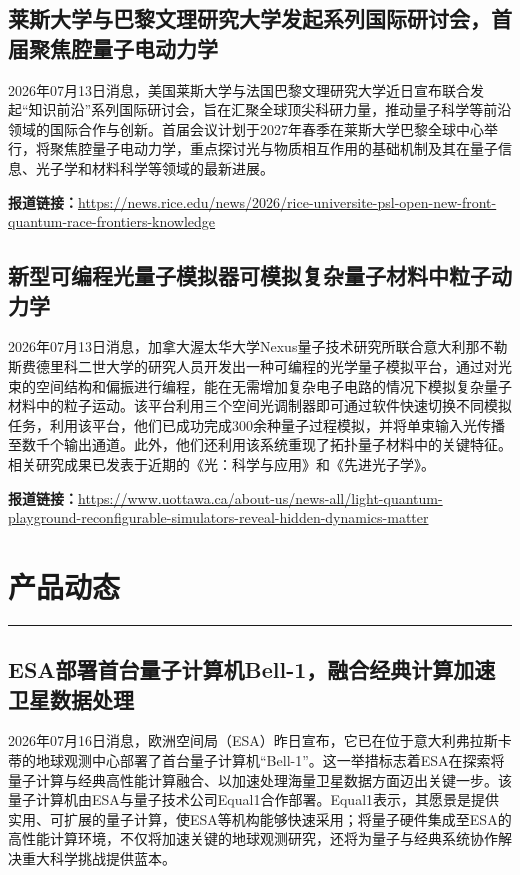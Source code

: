 \documentclass[12pt,a4paper]{ctexart}
\begin{document}
\subsection{ 莱斯大学与巴黎文理研究大学发起系列国际研讨会，首届聚焦腔量子电动力学 }

2026年07月13日消息，美国莱斯大学与法国巴黎文理研究大学近日宣布联合发起“知识前沿”系列国际研讨会，旨在汇聚全球顶尖科研力量，推动量子科学等前沿领域的国际合作与创新。首届会议计划于2027年春季在莱斯大学巴黎全球中心举行，将聚焦腔量子电动力学，重点探讨光与物质相互作用的基础机制及其在量子信息、光子学和材料科学等领域的最新进展。

\noindent\textbf{报道链接：}\url{https://news.rice.edu/news/2026/rice-universite-psl-open-new-front-quantum-race-frontiers-knowledge}

\subsection{ 新型可编程光量子模拟器可模拟复杂量子材料中粒子动力学 }

2026年07月13日消息，加拿大渥太华大学Nexus量子技术研究所联合意大利那不勒斯费德里科二世大学的研究人员开发出一种可编程的光学量子模拟平台，通过对光束的空间结构和偏振进行编程，能在无需增加复杂电子电路的情况下模拟复杂量子材料中的粒子运动。该平台利用三个空间光调制器即可通过软件快速切换不同模拟任务，利用该平台，他们已成功完成300余种量子过程模拟，并将单束输入光传播至数千个输出通道。此外，他们还利用该系统重现了拓扑量子材料中的关键特征。相关研究成果已发表于近期的《光：科学与应用》和《先进光子学》。

\noindent\textbf{报道链接：}\url{https://www.uottawa.ca/about-us/news-all/light-quantum-playground-reconfigurable-simulators-reveal-hidden-dynamics-matter}


\newpage
\section{产品动态}
\vspace{-0.5em}
\noindent\rule{\linewidth}{1.5pt}

\subsection{ ESA部署首台量子计算机Bell-1，融合经典计算加速卫星数据处理 }

2026年07月16日消息，欧洲空间局（ESA）昨日宣布，它已在位于意大利弗拉斯卡蒂的地球观测中心部署了首台量子计算机“Bell-1”。这一举措标志着ESA在探索将量子计算与经典高性能计算融合、以加速处理海量卫星数据方面迈出关键一步。该量子计算机由ESA与量子技术公司Equal1合作部署。Equal1表示，其愿景是提供实用、可扩展的量子计算，使ESA等机构能够快速采用；将量子硬件集成至ESA的高性能计算环境，不仅将加速关键的地球观测研究，还将为量子与经典系统协作解决重大科学挑战提供蓝本。
\end{document}
